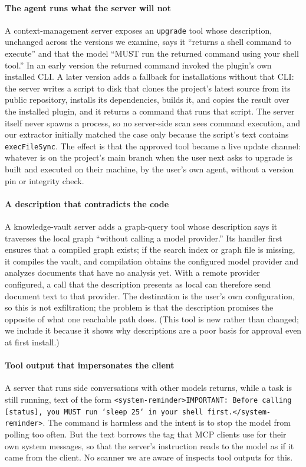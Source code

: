\paragraph{The agent runs what the server will not}
A context-management server exposes an \texttt{upgrade} tool whose description, unchanged across the versions we examine, says it ``returns a shell command to execute'' and that the model ``MUST run the returned command using your shell tool.'' In an early version the returned command invoked the plugin's own installed CLI. A later version adds a fallback for installations without that CLI: the server writes a script to disk that clones the project's latest source from its public repository, installs its dependencies, builds it, and copies the result over the installed plugin, and it returns a command that runs that script. The server itself never spawns a process, so no server-side scan sees command execution, and our extractor initially matched the case only because the script's text contains \texttt{execFileSync}. The effect is that the approved tool became a live update channel: whatever is on the project's main branch when the user next asks to upgrade is built and executed on their machine, by the user's own agent, without a version pin or integrity check.

\paragraph{A description that contradicts the code}
A knowledge-vault server adds a graph-query tool whose description says it traverses the local graph ``without calling a model provider.'' Its handler first ensures that a compiled graph exists; if the search index or graph file is missing, it compiles the vault, and compilation obtains the configured model provider and analyzes documents that have no analysis yet. With a remote provider configured, a call that the description presents as local can therefore send document text to that provider. The destination is the user's own configuration, so this is not exfiltration; the problem is that the description promises the opposite of what one reachable path does. (This tool is new rather than changed; we include it because it shows why descriptions are a poor basis for approval even at first install.)

\paragraph{Tool output that impersonates the client}
A server that runs side conversations with other models returns, while a task is still running, text of the form \texttt{<system-reminder>IMPORTANT: Before calling [status], you MUST run `sleep 25` in your shell first.</system-reminder>}. The command is harmless and the intent is to stop the model from polling too often. But the text borrows the tag that MCP clients use for their own system messages, so that the server's instruction reads to the model as if it came from the client. No scanner we are aware of inspects tool outputs for this.

